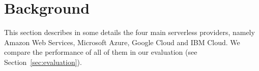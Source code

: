 \section{Background}
This section describes in some details the four main serverless providers, namely Amazon Web Services, Microsoft Azure, Google Cloud and IBM Cloud. 
We compare the performance of all of them in our evaluation (see Section~\ref{sec:evaluation}).


%
%
